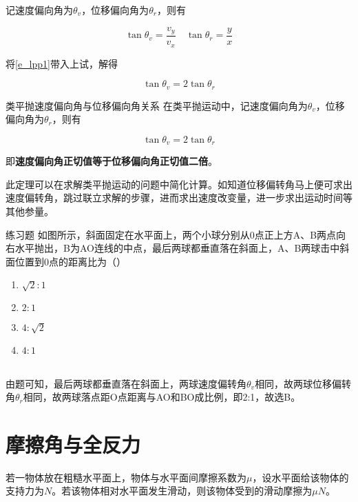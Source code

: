 记速度偏向角为$\theta_v$，位移偏向角为$\theta_r$，则有



$$\tan{\theta_v} = \frac{v_y}{v_x} \quad \tan{\theta_r} = \frac{y}{x}$$

将\eqref{e_lpp1}带入上试，解得

$$\tan{\theta_v} = 2 \tan{\theta_r}$$

\begin{theo}{类平抛速度偏向角与位移偏向角关系}{}
在类平抛运动中，记速度偏向角为$\theta_v$，位移偏向角为$\theta_r$，则有

$$\tan{\theta_v} = 2 \tan{\theta_r}$$

即\textbf{速度偏向角正切值等于位移偏向角正切值二倍}。
\end{theo}

此定理可以在求解类平抛运动的问题中简化计算。如知道位移偏转角马上便可求出速度偏转角，跳过联立求解的步骤，进而求出速度改变量，进一步求出运动时间等其他参量。

\begin{ep}{练习题}{}
如图所示，斜面固定在水平面上，两个小球分别从0点正上方A、B两点向右水平抛出，B为AO连线的中点，最后两球都垂直落在斜面上，A、B两球击中斜面位置到0点的距离比为（）

\begin{minipage}[b]{0.6\linewidth}
\begin{enumerate}[label=(\Alph*)]
  \item $\sqrt{2}:1$
  \item $2:1$
  \item $4:\sqrt{2}$
  \item $4:1$
\end{enumerate}
\end{minipage}
\hfill
\begin{minipage}[b]{0.3\linewidth}

\end{minipage}
~\\

由题可知，最后两球都垂直落在斜面上，两球速度偏转角$\theta_v$相同，故两球位移偏转角$\theta_r$相同，故两球落点距O点距离与AO和BO成比例，即2:1，故选B。
\end{ep}

\section{摩擦角与全反力}

若一物体放在粗糙水平面上，物体与水平面间摩擦系数为$\mu$，设水平面给该物体的支持力为$N$。若该物体相对水平面发生滑动，则该物体受到的滑动摩擦为$\mu N$。

